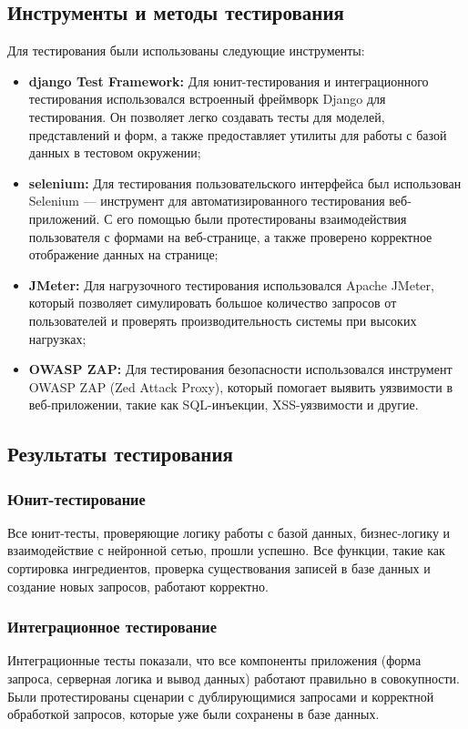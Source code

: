 {\subsection{Инструменты и методы тестирования}

Для тестирования были использованы следующие инструменты:

\begin{itemize}
    \item \textbf{django Test Framework:} Для юнит-тестирования и интеграционного тестирования использовался встроенный фреймворк Django для тестирования. Он позволяет легко создавать тесты для моделей, представлений и форм, а также предоставляет утилиты для работы с базой данных в тестовом окружении;
    \item \textbf{selenium:} Для тестирования пользовательского интерфейса был использован Selenium — инструмент для автоматизированного тестирования веб-приложений. С его помощью были протестированы взаимодействия пользователя с формами на веб-странице, а также проверено корректное отображение данных на странице;
    \item \textbf{JMeter:} Для нагрузочного тестирования использовался Apache JMeter, который позволяет симулировать большое количество запросов от пользователей и проверять производительность системы при высоких нагрузках;
    \item \textbf{OWASP ZAP:} Для тестирования безопасности использовался инструмент OWASP ZAP (Zed Attack Proxy), который помогает выявить уязвимости в веб-приложении, такие как SQL-инъекции, XSS-уязвимости и другие.
\end{itemize}

\subsection{Результаты тестирования}

\subsubsection*{Юнит-тестирование}
Все юнит-тесты, проверяющие логику работы с базой данных, бизнес-логику и взаимодействие с нейронной сетью, прошли успешно. Все функции, такие как сортировка ингредиентов, проверка существования записей в базе данных и создание новых запросов, работают корректно.

\subsubsection*{Интеграционное тестирование}
Интеграционные тесты показали, что все компоненты приложения (форма запроса, серверная логика и вывод данных) работают правильно в совокупности. Были протестированы сценарии с дублирующимися запросами и корректной обработкой запросов, которые уже были сохранены в базе данных.

}
